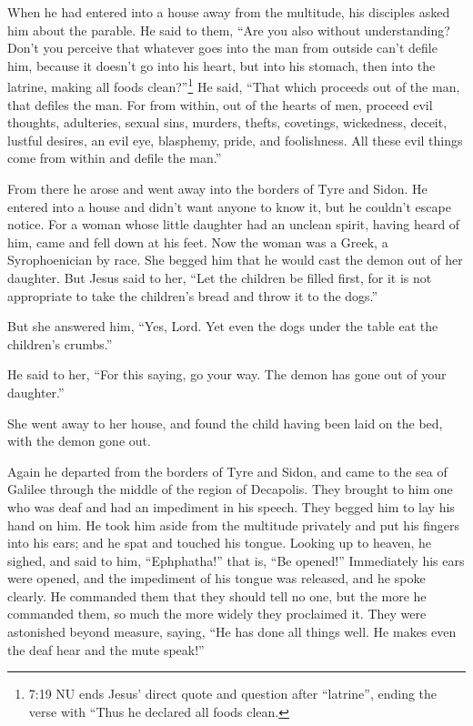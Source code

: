  When he had entered into a house away from the multitude,
his disciples asked him about the parable.  He said to
them, ``Are you also without understanding? Don't you perceive that
whatever goes into the man from outside can't defile him, 
because it doesn't go into his heart, but into his stomach, then into
the latrine, making all foods clean?''\footnote{7:19 NU ends Jesus'
  direct quote and question after ``latrine'', ending the verse with
  ``Thus he declared all foods clean.}  He said, ``That
which proceeds out of the man, that defiles the man.  For
from within, out of the hearts of men, proceed evil thoughts,
adulteries, sexual sins, murders, thefts,  covetings,
wickedness, deceit, lustful desires, an evil eye, blasphemy, pride, and
foolishness.  All these evil things come from within and
defile the man.''

 From there he arose and went away into the borders of Tyre
and Sidon. He entered into a house and didn't want anyone to know it,
but he couldn't escape notice.  For a woman whose little
daughter had an unclean spirit, having heard of him, came and fell down
at his feet.  Now the woman was a Greek, a Syrophoenician
by race. She begged him that he would cast the demon out of her
daughter.  But Jesus said to her, ``Let the children be
filled first, for it is not appropriate to take the children's bread and
throw it to the dogs.''

 But she answered him, ``Yes, Lord. Yet even the dogs under
the table eat the children's crumbs.''

 He said to her, ``For this saying, go your way. The demon
has gone out of your daughter.''

 She went away to her house, and found the child having
been laid on the bed, with the demon gone out.

 Again he departed from the borders of Tyre and Sidon, and
came to the sea of Galilee through the middle of the region of
Decapolis.  They brought to him one who was deaf and had an
impediment in his speech. They begged him to lay his hand on him.
 He took him aside from the multitude privately and put his
fingers into his ears; and he spat and touched his tongue. 
Looking up to heaven, he sighed, and said to him, ``Ephphatha!'' that
is, ``Be opened!''  Immediately his ears were opened, and
the impediment of his tongue was released, and he spoke clearly.
 He commanded them that they should tell no one, but the
more he commanded them, so much the more widely they proclaimed it.
 They were astonished beyond measure, saying, ``He has done
all things well. He makes even the deaf hear and the mute speak!''

